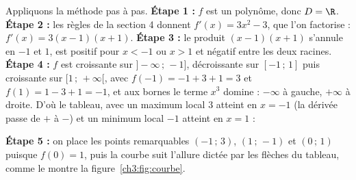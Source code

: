 \begin{exemple}[étude complète de $f(x) = x^{3} - 3x + 1$]
Appliquons la méthode pas à pas. \textbf{Étape 1 :} $f$ est un polynôme, donc $D = \R$. \textbf{Étape 2 :} les règles de la section 4 donnent $f'(x) = 3x^{2} - 3$, que l'on factorise : $f'(x) = 3(x-1)(x+1)$. \textbf{Étape 3 :} le produit $(x-1)(x+1)$ s'annule en $-1$ et $1$, est positif pour $x < -1$ ou $x > 1$ et négatif entre les deux racines. \textbf{Étape 4 :} $f$ est croissante sur $]-\infty\,;\,-1]$, décroissante sur $[-1\,;\,1]$ puis croissante sur $[1\,;\,+\infty[$, avec $f(-1) = -1 + 3 + 1 = 3$ et $f(1) = 1 - 3 + 1 = -1$, et aux bornes le terme $x^{3}$ domine : $-\infty$ à gauche, $+\infty$ à droite. D'où le tableau, avec un maximum local $3$ atteint en $x = -1$ (la dérivée passe de $+$ à $-$) et un minimum local $-1$ atteint en $x = 1$ :

\begin{center}
\end{center}

\textbf{Étape 5 :} on place les points remarquables $(-1\,;\,3)$, $(1\,;\,-1)$ et $(0\,;\,1)$ puisque $f(0) = 1$, puis la courbe suit l'allure dictée par les flèches du tableau, comme le montre la figure~\ref{ch3:fig:courbe}.


\end{exemple}
